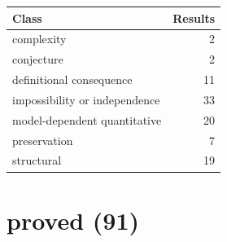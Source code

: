 \documentclass[11pt,twoside,openright]{book}
\theoremstyle{plain}
\theoremstyle{definition}
\theoremstyle{remark}
\begin{document}
\begin{tabular}{lr}
\toprule
Class & Results \\
\midrule
complexity & 2 \\
conjecture & 2 \\
definitional consequence & 11 \\
impossibility or independence & 33 \\
model-dependent quantitative & 20 \\
preservation & 7 \\
structural & 19 \\
\bottomrule
\end{tabular}

\section*{proved (91)}
\end{document}
